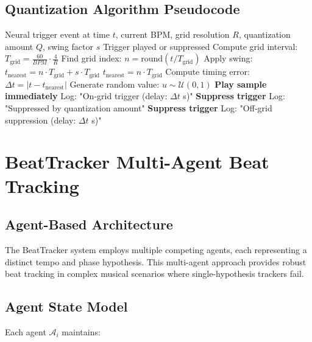 \documentclass[11pt,a4paper]{article}
\begin{document}
\subsection{Quantization Algorithm Pseudocode}

\begin{algorithm}
\caption{Real-Time Musical Quantization}
\begin{algorithmic}[1]
\REQUIRE Neural trigger event at time $t$, current BPM, grid resolution $R$, quantization amount $Q$, swing factor $s$
\ENSURE Trigger played or suppressed
\STATE Compute grid interval: $T_{\text{grid}} = \frac{60}{BPM} \cdot \frac{4}{R}$
\STATE Find grid index: $n = \text{round}(t / T_{\text{grid}})$
    \STATE Apply swing: $t_{\text{nearest}} = n \cdot T_{\text{grid}} + s \cdot T_{\text{grid}}$
\ELSE
    \STATE $t_{\text{nearest}} = n \cdot T_{\text{grid}}$
\ENDIF
\STATE Compute timing error: $\Delta t = |t - t_{\text{nearest}}|$
    \STATE Generate random value: $u \sim \mathcal{U}(0,1)$
        \STATE \textbf{Play sample immediately}
        \STATE Log: "On-grid trigger (delay: $\Delta t$ s)"
    \ELSE
        \STATE \textbf{Suppress trigger}
        \STATE Log: "Suppressed by quantization amount"
    \ENDIF
\ELSE
    \STATE \textbf{Suppress trigger}
    \STATE Log: "Off-grid suppression (delay: $\Delta t$ s)"
\ENDIF
\end{algorithmic}
\end{algorithm}

\section{BeatTracker Multi-Agent Beat Tracking}

\subsection{Agent-Based Architecture}

The BeatTracker system employs multiple competing agents, each representing a distinct tempo and phase hypothesis. This multi-agent approach provides robust beat tracking in complex musical scenarios where single-hypothesis trackers fail.

\subsection{Agent State Model}

Each agent $\mathcal{A}_i$ maintains:
\end{document}
